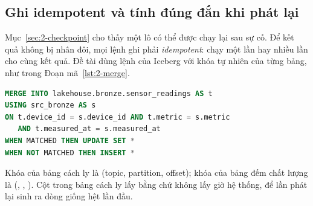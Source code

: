 \subsection{Ghi idempotent và tính đúng đắn khi phát lại}
\label{sec:2-idempotent}

Mục~\ref{sec:2-checkpoint} cho thấy một lô có thể được chạy lại sau sự cố. Để kết quả không bị nhân đôi, mọi lệnh ghi phải \emph{idempotent}: chạy một lần hay nhiều lần cho cùng kết quả. Đề tài dùng lệnh  của Iceberg với khóa tự nhiên của từng bảng, như trong Đoạn mã~\ref{lst:2-merge}.

\begin{lstlisting}[language=SQL, caption={Ghi idempotent bằng MERGE}, label={lst:2-merge}]
MERGE INTO lakehouse.bronze.sensor_readings AS t
USING src_bronze AS s
ON t.device_id = s.device_id AND t.metric = s.metric
   AND t.measured_at = s.measured_at
WHEN MATCHED THEN UPDATE SET *
WHEN NOT MATCHED THEN INSERT *
\end{lstlisting}

Khóa của bảng cách ly là (topic, partition, offset); khóa của bảng đếm chất lượng là (, , ). Cột  trong bảng cách ly lấy bằng  chứ không lấy giờ hệ thống, để lần phát lại sinh ra dòng giống hệt lần đầu.
